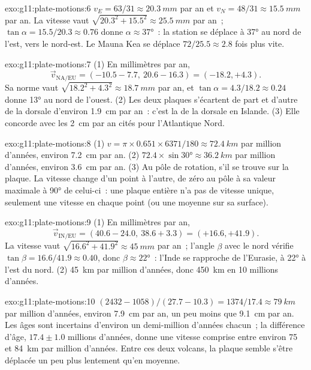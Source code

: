 \begin{solution}{exo:g11:plate-motions:6}
$v_E = 63/31 \approx \qty{20.3}{mm}$ par an et $v_N = 48/31 \approx
\qty{15.5}{mm}$ par an. La vitesse vaut $\sqrt{20.3^2 + 15.5^2} \approx
\qty{25.5}{mm}$ par an~; $\tan\alpha = 15.5/20.3 \approx 0.76$ donne $\alpha
\approx \ang{37}$~: la station se déplace à \ang{37} au nord de l'est, vers
le nord-est. Le Mauna Kea se déplace $72/25.5 \approx 2.8$ fois plus vite.
\end{solution}

\begin{solution}{exo:g11:plate-motions:7}
(1) En millimètres par an,
\[
  \vec v_{\mathrm{NA/EU}} = (-10.5 - 7.7,\ 20.6 - 16.3) = (-18.2, +4.3).
\] Sa norme vaut $\sqrt{18.2^2 + 4.3^2} \approx
\qty{18.7}{mm}$ par an, et $\tan\alpha = 4.3/18.2 \approx 0.24$ donne
\ang{13} au nord de l'ouest. (2) Les deux plaques s'écartent de part et
d'autre de la dorsale d'environ \qty{1.9}{cm} par an~: c'est la  de la dorsale en Islande. (3) Elle concorde avec les
\qty{2}{cm} par an cités pour l'Atlantique Nord.
\end{solution}

\begin{solution}{exo:g11:plate-motions:8}
(1) $v = \pi \times 0.651 \times 6371/180 \approx \qty{72.4}{km}$ par million
d'années, environ \qty{7.2}{cm} par an. (2) $72.4 \times \sin\ang{30} \approx
\qty{36.2}{km}$ par million d'années, environ \qty{3.6}{cm} par an. (3) Au
pôle de rotation, s'il se trouve sur la plaque. La vitesse change d'un point
à l'autre, de zéro au pôle à sa valeur maximale à \ang{90} de celui-ci~: une
plaque entière n'a pas de vitesse unique, seulement une vitesse en chaque
point (ou une moyenne sur sa surface).
\end{solution}

\begin{solution}{exo:g11:plate-motions:9}
(1) En millimètres par an,
\[
  \vec v_{\mathrm{IN/EU}} = (40.6 - 24.0,\ 38.6 + 3.3) = (+16.6, +41.9).
\] La vitesse vaut $\sqrt{16.6^2 + 41.9^2} \approx
\qty{45}{mm}$ par an~; l'angle $\beta$ avec le nord vérifie $\tan\beta =
16.6/41.9 \approx 0.40$, donc $\beta \approx \ang{22}$~: l'Inde se rapproche
de l'Eurasie, à \ang{22} à l'est du nord. (2) \qty{45}{km} par million
d'années, donc \qty{450}{km} en 10 millions d'années.
\end{solution}

\begin{solution}{exo:g11:plate-motions:10}
$(2432 - 1058)/(27.7 - 10.3) = 1374/17.4 \approx \qty{79}{km}$ par million
d'années, environ \qty{7.9}{cm} par an, un peu moins que \qty{9.1}{cm} par
an. Les âges sont incertains d'environ un demi-million d'années chacun~; la
différence d'âge, $17.4 \pm 1.0$ millions d'années, donne une vitesse
comprise entre environ 75 et \qty{84}{km} par million d'années. Entre ces
deux volcans, la plaque semble s'être déplacée un peu plus lentement qu'en
moyenne.
\end{solution}

